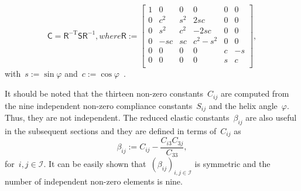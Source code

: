 \documentclass[preprint,10pt,times]{elsarticle}
\numberwithin{equation}{section}
\newcommand{\pd}[2]{\frac{\partial #1}{\partial #2}}
\renewcommand{\u}[1]{\boldsymbol{#1}}
\newcommand{\usf}[1]{\u{\mathsf #1}}
\newcommand{\pr}[1]{\left( #1 \right)}
\renewcommand{\>}{$\Rightarrow$}
\begin{document}
\begin{subequations}
\begin{equation}
\usf{C}= \usf{R}^{-\text{T}}\usf{S}\usf{R}^{-1},
\end{equation}
where
\begin{equation}
	\usf{R}
	:=
	\left[
	\begin{array}{cccccc}
	 1 & 0 & 0 & 0 & 0 & 0 \\
	 0 & c^2 & s^2 & 2sc & 0 & 0 \\
	 0 & s^2 & c^2 & -2sc & 0 & 0 \\
	 0 & -sc & sc & c^2 - s^2 & 0 & 0 \\
	 0 & 0 & 0 & 0 & c & -s \\
	 0 & 0 & 0 & 0 & s & c \\
	\end{array}
	\right],
\end{equation}
\end{subequations}
with~$s :=\sin \varphi$ and~$c :=\cos \varphi$~\cite{Bower2009}.

It should be noted that the thirteen non-zero constants~$C_{ij}$ are computed from the nine independent non-zero compliance constants~$S_{ij}$ and the helix angle~$\varphi$. Thus, they are not independent. The reduced elastic constants~$\beta_{ij}$ are also useful in the subsequent sections and they are defined in terms of~$C_{ij}$ as
\begin{equation}
\beta_{ij} := C_{ij}-\frac{C_{i3} C_{3j}}{C_{33}},
\end{equation}
for~$i,j \in\mathcal{I}$. It can be easily shown that~$\pr{\beta_{ij}}_{i,j \in\mathcal{I}}$ is symmetric and the number of independent non-zero elements is nine.

%
\end{document}
